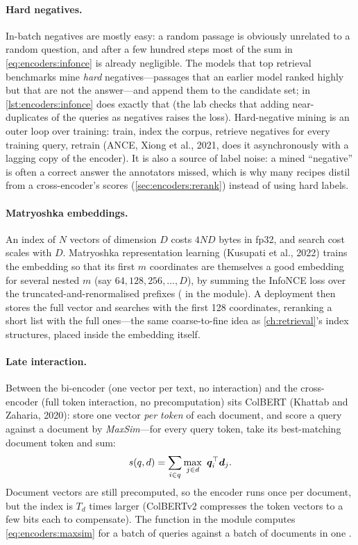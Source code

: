 \paragraph{Hard negatives.} In-batch negatives are mostly easy: a random passage is obviously
unrelated to a random question, and after a few hundred steps most of the sum in
\cref{eq:encoders:infonce} is already negligible. The models that top retrieval benchmarks mine
\emph{hard} negatives---passages that an earlier model ranked highly but that are not the answer---and
append them to the candidate set;  in \cref{lst:encoders:infonce} does
exactly that (the lab checks that adding near-duplicates of the queries as negatives raises the
loss). Hard-negative mining is an outer loop over training: train, index the corpus, retrieve
negatives for every training query, retrain (ANCE, Xiong et al., 2021, does it asynchronously with a
lagging copy of the encoder). It is also a source of label noise: a mined ``negative'' is often a
correct answer the annotators missed, which is why many recipes distil from a cross-encoder's scores
(\cref{sec:encoders:rerank}) instead of using hard labels.

\paragraph{Matryoshka embeddings.} An index of $N$ vectors of dimension $D$ costs $4ND$ bytes in
fp32, and search cost scales with $D$. Matryoshka representation learning (Kusupati et al., 2022)
trains the embedding so that its first $m$ coordinates are themselves a good embedding for several
nested $m$ (say $64,128,256,\ldots,D$), by summing the InfoNCE loss over the truncated-and-renormalised
prefixes ( in the module). A deployment then stores the full vector and
searches with the first 128 coordinates, reranking a short list with the full ones---the same
coarse-to-fine idea as \cref{ch:retrieval}'s index structures, placed inside the embedding itself.

\paragraph{Late interaction.} Between the bi-encoder (one vector per text, no interaction) and the
cross-encoder (full token interaction, no precomputation) sits ColBERT (Khattab and Zaharia, 2020):
store one vector \emph{per token} of each document, and score a query against a document by
\emph{MaxSim}---for every query token, take its best-matching document token and sum:
\begin{equation}
s(q,d) = \sum_{i\in q}\max_{j\in d}\ \bm{q}_i^\top\bm{d}_j .
\label{eq:encoders:maxsim}
\end{equation}
Document vectors are still precomputed, so the encoder runs once per document, but the index is
$T_d$ times larger (ColBERTv2 compresses the token vectors to a few bits each to compensate). The
function  in the module computes \cref{eq:encoders:maxsim} for a batch of
queries against a batch of documents in one .

